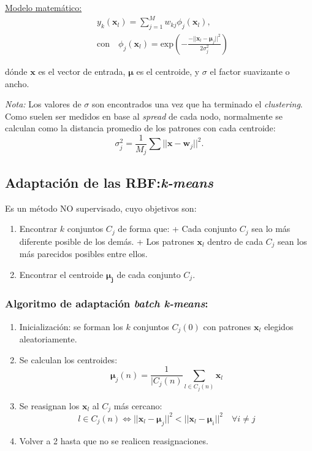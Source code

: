 \documentclass[10pt,a4paper]{article}
\begin{document}
\underline{Modelo matemático:}
\begin{align*}
&y_k (\mathbf{x}_l) = \sum_{j=1}^M w_{kj} \phi_j (\mathbf{x}_l), 
\\ &\text{con} \quad \phi_j (\mathbf{x}_l) = \text{exp}\left({-\frac{-||\mathbf{x}_l - \mathbf{\mu}_j||^2}{2 \sigma_j^2}}\right)
\end{align*}

dónde $\mathbf{x}$ es el vector de entrada, $\mathbf{\mu}$ es el centroide, y $\sigma$ el factor suavizante o ancho.

\textit{Nota:} Los valores de $\sigma$ son encontrados una vez que ha terminado el \textit{clustering}. Como suelen ser medidos en base al \textit{spread} de cada nodo, normalmente se calculan como la distancia promedio de los patrones con cada centroide:
\[\sigma_j^2 = \frac{1}{M_j} \sum ||\mathbf{x} - \mathbf{w}_j||^2.\]

\subsection{Adaptación de las RBF:\textit{k-means}}
Es un método NO supervisado, cuyo objetivos son:
\begin{enumerate}
\item Encontrar $k$ conjuntos $C_j$ de forma que:
\subitem + Cada conjunto $C_j$ sea lo más diferente posible de los demás.
\subitem + Los patrones $\mathbf{x}_l$ dentro de cada $C_j$ sean los más parecidos posibles entre ellos.
\item Encontrar el centroide $\mathbf{\mu_j}$ de cada conjunto $C_j$.
\end{enumerate}

\subsubsection{Algoritmo de adaptación \textit{batch k-means}:}
\begin{enumerate}
\item Inicialización: se forman los $k$ conjuntos $C_j(0)$ con patrones $\mathbf{x}_l$ elegidos aleatoriamente.
\item Se calculan los centroides:
\[\mathbf{\mu}_j(n) = \frac{1}{|C_j(n)}\sum_{l\in C_j(n)} \mathbf{x}_l\]
\item Se reasignan los $\mathbf{x}_l$ al $C_j$ más cercano:
\[ l \in C_j(n) \iff ||\mathbf{x}_l -\mathbf{\mu}_j||^2 < ||\mathbf{x}_l -\mathbf{\mu}_i||^2 \quad \forall i\neq j\]
\item Volver a 2 hasta que no se realicen reasignaciones.
\end{enumerate}
\end{document}
